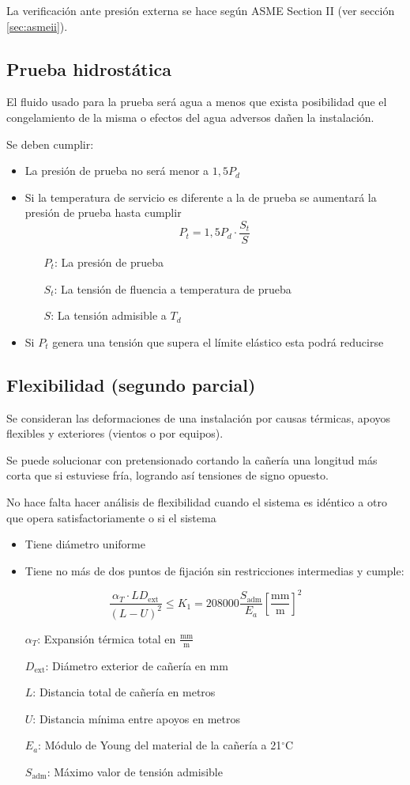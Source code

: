 \documentclass[twocolumn]{article}
\newcommand{\adm}{\text{adm}}
\newcommand{\Dext}{D_\text{ext}}
\newcommand{\grad}{\ensuremath{^\circ \textrm{C}}}
\begin{document}
La verificación ante presión externa se hace según ASME Section II (ver sección \ref{sec:asmeii}).

\subsection{Prueba hidrostática}
El fluido usado para la prueba será agua a menos que exista posibilidad que el congelamiento de la misma o efectos del agua adversos dañen la instalación.

Se deben cumplir:
\begin{itemize}
	\item La presión de prueba no será menor a $1,5 P_d$
	\item Si la temperatura de servicio es diferente a la de prueba se aumentará la presión de prueba hasta cumplir
	\[
	P_t = 1,5 P_d \cdot \frac{S_t}{S}
	\]
	\begin{itemize}
		\item[$P_t$:] La presión de prueba
		\item[$S_t$:] La tensión de fluencia a temperatura de prueba
		\item[$S$:] La tensión admisible a $T_d$
	\end{itemize}
	\item Si $P_t$ genera una tensión que supera el límite elástico esta podrá reducirse
\end{itemize}


\subsection{Flexibilidad (segundo parcial)}
Se consideran las deformaciones de una instalación por causas térmicas, apoyos flexibles y exteriores (vientos o por equipos).

Se puede solucionar con pretensionado cortando la cañería una longitud más corta que si estuviese fría, logrando así tensiones de signo opuesto.

No hace falta hacer análisis de flexibilidad cuando el sistema es idéntico a otro que opera satisfactoriamente o si el sistema
\begin{itemize}
	\item Tiene diámetro uniforme
	\item Tiene no más de dos puntos de fijación sin restricciones intermedias y cumple:
\end{itemize}
\[
\frac{\alpha_T \cdot L \Dext }{(L-U)^2} \leq K_1 = 208000 \frac{S_\adm}{E_a} \left[\frac{\text{mm}}{\text{m}}\right]^2
\]
\begin{itemize}
	\item[$\alpha_T$:] Expansión térmica total en $\frac{\text{mm}}{\text{m}}$
	\item[$\Dext$:] Diámetro exterior de cañería en mm
	\item[$L$:] Distancia total de cañería en metros
	\item[$U$:] Distancia mínima entre apoyos en metros
	\item[$E_a$:] Módulo de Young del material de la cañería a 21\grad
	\item[$S_\adm$:] Máximo valor de tensión admisible
\end{itemize}
\end{document}
